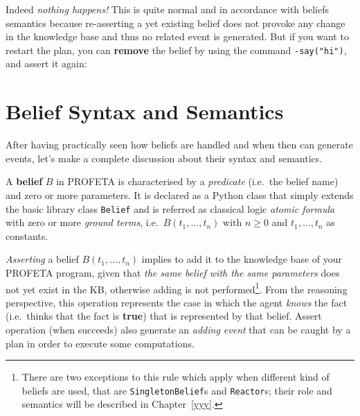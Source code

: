 Indeed \emph{nothing happens!} This is quite normal and in accordance with
beliefs semantics because re-asserting a yet existing belief does not
provoke any change in the knowledge base and thus no related event is
generated.
But if you want to restart the plan, you can \textbf{remove} the belief by
using the command \texttt{-say("hi")}, and assert it again:

\section{Belief Syntax and Semantics}
After having practically seen how beliefs are handled and when then can
generate events, let's make a complete discussion about their syntax and
semantics.

A \textbf{belief} $B$ in PROFETA is characterised by a \emph{predicate}
(i.e.~the belief name) and zero or more parameters.
It is declared as a Python class that simply extends the basic library
class \texttt{Belief} and is referred as classical logic \emph{atomic
  formula} with zero or more \emph{ground terms}, i.e.~$B(t_1, \dots, t_n)$
with $n \ge 0$ and $t_1, \dots, t_n$ as constants.

\emph{Asserting} a belief $B(t_1, \dots, t_n)$ implies to add it to the
knowledge base of your PROFETA program, given that \emph{the same belief
  with the same parameters} does not yet exist in the KB, otherwise
adding is not performed\footnote{There are two exceptions to this rule
  which apply when different kind of beliefs are used, that are
  \texttt{SingletonBelief}s and \texttt{Reactor}s; their role and semantics
  will be described in Chapter~\ref{yyy}.}.
From the reasoning perspective, this operation represents the case in which
the agent \emph{knows} the fact (i.e.~thinks that the fact is
\textbf{true}) that is
represented by that belief.
Assert operation (when succeeds) also generate an \emph{adding event} that
can be caught by a plan in order to execute some computations.

